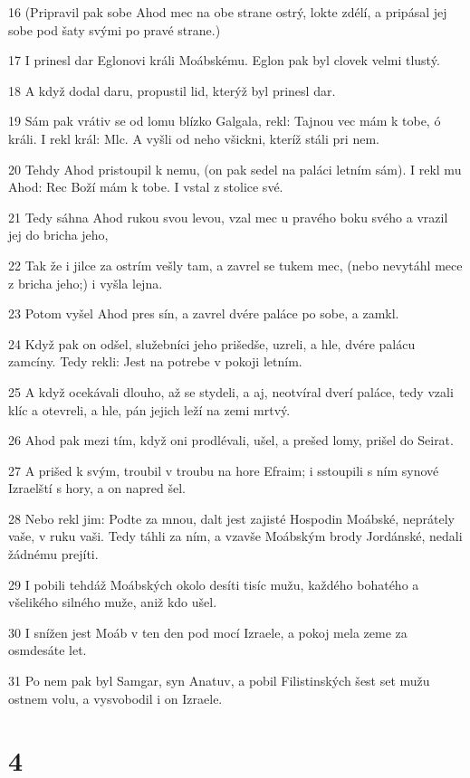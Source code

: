\par 16 (Pripravil pak sobe Ahod mec na obe strane ostrý, lokte zdélí, a pripásal jej sobe pod šaty svými po pravé strane.)
\par 17 I prinesl dar Eglonovi králi Moábskému. Eglon pak byl clovek velmi tlustý.
\par 18 A když dodal daru, propustil lid, kterýž byl prinesl dar.
\par 19 Sám pak vrátiv se od lomu blízko Galgala, rekl: Tajnou vec mám k tobe, ó králi. I rekl král: Mlc. A vyšli od neho všickni, kteríž stáli pri nem.
\par 20 Tehdy Ahod pristoupil k nemu, (on pak sedel na paláci letním sám). I rekl mu Ahod: Rec Boží mám k tobe. I vstal z stolice své.
\par 21 Tedy sáhna Ahod rukou svou levou, vzal mec u pravého boku svého a vrazil jej do bricha jeho,
\par 22 Tak že i jilce za ostrím vešly tam, a zavrel se tukem mec, (nebo nevytáhl mece z bricha jeho;) i vyšla lejna.
\par 23 Potom vyšel Ahod pres sín, a zavrel dvére paláce po sobe, a zamkl.
\par 24 Když pak on odšel, služebníci jeho prišedše, uzreli, a hle, dvére palácu zamcíny. Tedy rekli: Jest na potrebe v pokoji letním.
\par 25 A když ocekávali dlouho, až se stydeli, a aj, neotvíral dverí paláce, tedy vzali klíc a otevreli, a hle, pán jejich leží na zemi mrtvý.
\par 26 Ahod pak mezi tím, když oni prodlévali, ušel, a prešed lomy, prišel do Seirat.
\par 27 A prišed k svým, troubil v troubu na hore Efraim; i sstoupili s ním synové Izraelští s hory, a on napred šel.
\par 28 Nebo rekl jim: Podte za mnou, dalt jest zajisté Hospodin Moábské, neprátely vaše, v ruku vaši. Tedy táhli za ním, a vzavše Moábským brody Jordánské, nedali žádnému prejíti.
\par 29 I pobili tehdáž Moábských okolo desíti tisíc mužu, každého bohatého a všelikého silného muže, aniž kdo ušel.
\par 30 I snížen jest Moáb v ten den pod mocí Izraele, a pokoj mela zeme za osmdesáte let.
\par 31 Po nem pak byl Samgar, syn Anatuv, a pobil Filistinských šest set mužu ostnem volu, a vysvobodil i on Izraele.

\chapter{4}

